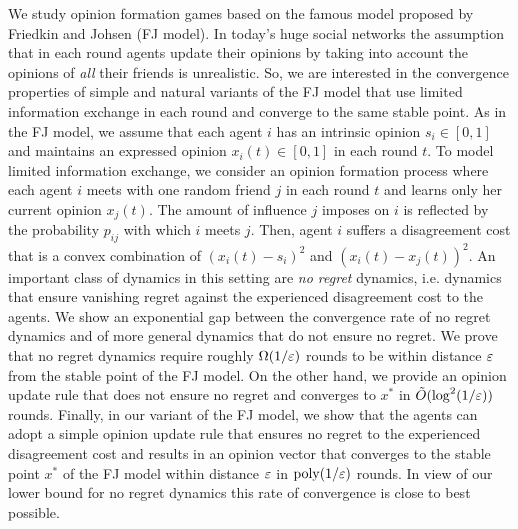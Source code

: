 We study opinion formation games based on the famous model proposed by Friedkin
and Johsen (FJ model). In today's huge social networks the assumption that in
each round agents update their opinions by taking into account the opinions of
\emph{all} their friends is unrealistic. So, we are interested in the convergence
properties of simple and natural variants of the FJ model that use limited
information exchange in each round and converge to the same stable point.
%
As in the FJ model, we assume that each agent $i$ has an intrinsic opinion $s_i
\in [0,1]$ and maintains an expressed opinion $x_i(t) \in [0,1]$ in each round
$t$. To model limited information exchange, we consider an opinion formation
process where each agent $i$ meets with  one random friend $j$ in each round
$t$ and learns only her current opinion $x_j(t)$. The amount of influence $j$
imposes on $i$ is reflected by the probability $p_{ij}$ with which $i$ meets
$j$. Then, agent $i$ suffers a disagreement cost that is a convex combination
of $(x_i(t) - s_i)^2$ and $(x_i(t) - x_j(t))^2$.
%
An important class of dynamics in this setting are \emph{no regret} dynamics,
i.e. dynamics that ensure vanishing regret against the experienced
disagreement cost to the agents.  We show an exponential gap between
the convergence rate of no regret dynamics and of more general
dynamics that do not ensure no regret.  We prove that no regret dynamics
require roughly $\Omega(1/\varepsilon)$ rounds to be within distance $\varepsilon$ from the stable
point of the FJ model.  On the other hand, we provide an opinion update rule that does
not ensure no regret and converges to $x^\ast$ in $\tilde{O}(\log^2(1/\varepsilon))$
rounds.  Finally, in our variant of the FJ model, we show that the agents can adopt
a simple opinion update rule that ensures no regret to the experienced disagreement
cost and results in an opinion vector that converges to the stable point $x^\ast$
of the FJ model within distance $\varepsilon$ in $\mathrm{poly}(1/\varepsilon)$ rounds. In view of our
lower bound for no regret dynamics this rate of convergence is close to best
possible.
